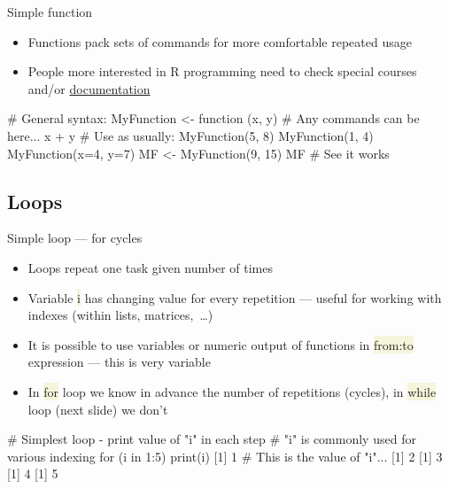 \documentclass[compress, ucs, xelatex, 11pt, xcolor=svgnames, aspectratio=169,
	hyperref={
		bookmarks=true,
		unicode=true,
		colorlinks=true,
		pdftitle={Molecular data in R},
		plainpages=false,
		pdfauthor={Vojtech Zeisek},
		pdfsubject={Course about phylogeny and evolution in R},
		pdfcreator={XeLaTeX},
		pdfkeywords={R, evolution, phylogeny, molecular data},
		linkcolor=Crimson, %
		anchorcolor=Magenta, %
		citecolor=Magenta, %
		filecolor=Magenta, %
		menucolor=Magenta, %
		urlcolor=DodgerBlue, %
		pdftex},
	url={hyphens, lowtilde} %
	]{beamer}
\renewcommand{\texttt}[1]{\colorbox{Beige}{{\ttfamily #1}}}
\begin{document}
\begin{frame}[fragile]{Simple function}
	\begin{itemize}
		\item Functions pack sets of commands for more comfortable repeated usage
		\item People more interested in R programming need to check special courses and/or \href{https://CRAN.R-project.org/manuals.html}{documentation}
	\end{itemize}
	\begin{spluscode}
    # General syntax:
    MyFunction <- function (x, y) {
      # Any commands can be here...
      x + y
      }
    # Use as usually:
    MyFunction(5, 8)
    MyFunction(1, 4)
    MyFunction(x=4, y=7)
    MF <- MyFunction(9, 15)
    MF # See it works
	\end{spluscode}
\end{frame}

\subsection{Loops}

\begin{frame}[fragile]{Simple loop --- for cycles}
	\begin{itemize}
		\item Loops repeat one task given number of times
		\item Variable \texttt{i} has changing value for every repetition --- useful for working with indexes (within lists, matrices,~\ldots)
		\item It is possible to use variables or numeric output of functions in \texttt{from:to} expression --- this is very variable
		\item In \texttt{for} loop we know in advance the number of repetitions (cycles), in \texttt{while} loop (next slide) we don't
	\end{itemize}
	\begin{spluscode}
    # Simplest loop - print value of "i" in each step
    # "i" is commonly used for various indexing
    for (i in 1:5) { print(i) }
    [1] 1 # This is the value of "i"...
    [1] 2
    [1] 3
    [1] 4
    [1] 5
	\end{spluscode}
\end{frame}
\end{document}

